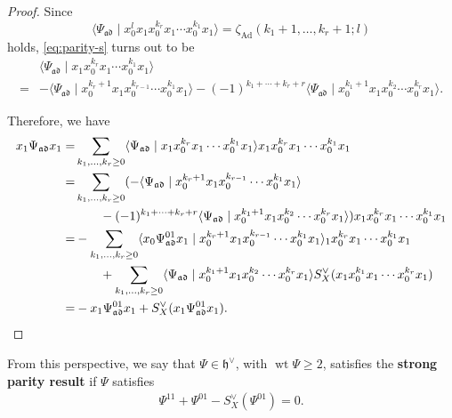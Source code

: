 \documentclass[15pt,oneside,reqno]{amsart}
\theoremstyle{remark}{
\newtheorem{lem}[df]{Lemma}
\newtheorem{prop}[df]{Proposition}
\newtheorem{ex}[df]{Example}
\newtheorem{rmk}[df]{Remark}
}
\newcommand{\ide}[1]{\mathfrak{#1}}
\newcommand{\ad}{\mathfrak{ad}}
\DeclareMathOperator{\wt}{wt}
\begin{document}
\begin{proof}
Since
\[
\langle \Psi_{\ad} \mid x_0^lx_1x_0^{k_r}x_1\cdots x_0^{k_1}x_1 \rangle
= \zeta_{\mathrm{Ad}}(k_1+1,\ldots,k_r+1;l)
\]
holds, \eqref{eq:parity-s} turns out to be
\begin{align*}
& \langle \Psi_{\ad} \mid x_1x_0^{k_r}x_1\cdots x_0^{k_1}x_1 \rangle\\
=&-  \langle \Psi_{\ad} \mid x_0^{k_r+1}x_1x_0^{k_{r-1}}\cdots x_0^{k_1}x_1 \rangle - (-1)^{k_1+\cdots +k_r + r} \langle \Psi_{\ad} \mid x_0^{k_1+1}x_1x_0^{k_{2}}\cdots x_0^{k_r}x_1 \rangle.
\end{align*}

Therefore, we have
\begin{align*}
x_1\Psi_{\ad} x_1 =& \sum_{k_1,\ldots,k_r\ge 0}  \langle \Psi_{\ad} \mid x_1x_0^{k_r}x_1\cdots x_0^{k_1}x_1 \rangle x_1x_0^{k_r}x_1\cdots x_0^{k_1}x_1 \\
&
\begin{aligned}
\hspace{-0.3cm}=&\sum_{k_1,\ldots,k_r\ge 0} (-  \langle \Psi_{\ad} \mid x_0^{k_r+1}x_1x_0^{k_{r-1}}\cdots x_0^{k_1}x_1 \rangle\\
&\qquad - (-1)^{k_1+\cdots +k_r + r} \langle \Psi_{\ad} \mid x_0^{k_1+1}x_1x_0^{k_{2}}\cdots x_0^{k_r}x_1 \rangle ) x_1x_0^{k_r}x_1\cdots x_0^{k_1}x_1
\end{aligned}\\
&
\begin{aligned}
\hspace{-0.3cm}=&-\sum_{k_1,\ldots,k_r\ge 0}   \langle x_0\Psi_{\ad}^{01} x_1 \mid x_0^{k_r+1}x_1x_0^{k_{r-1}}\cdots x_0^{k_1}x_1 \rangle _1x_0^{k_r}x_1\cdots x_0^{k_1}x_1 \\
&\qquad + \sum_{k_1,\ldots,k_r\ge 0} \langle \Psi_{\ad} \mid x_0^{k_1+1}x_1x_0^{k_{2}}\cdots x_0^{k_r}x_1 \rangle S_X^{\vee} (x_1x_0^{k_1}x_1\cdots x_0^{k_r}x_1)\\
\end{aligned}\\
=& - x_1\Psi_{\ad}^{01}x_1 + S_X^{\vee}(x_1\Psi_{\ad}^{01}x_1).
\end{align*}

\end{proof}

From this perspective, we say that $\Psi \in \ide{h}^{\vee}$, with $\wt \Psi\ge 2$, satisfies  the \textbf{strong parity result} if $\Psi$ satisfies
\begin{align}
\Psi^{11} + \Psi^{01} - S_{X}^{\vee}(\Psi^{01}) = 0. \label{eq:str-parity-pri}
\end{align}
\end{document}
